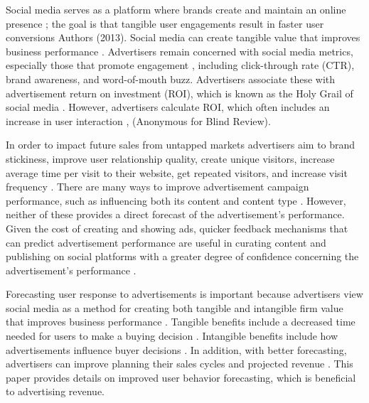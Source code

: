 \documentclass[mksc,blindrev]{informs3} %
\begin{document}
Social media serves as a platform where brands create and maintain an online presence \cite{Greenwood2016}; the goal is that tangible user engagements result in faster user conversions Authors (2013). Social media can create tangible value that improves business performance \cite{Barreto2013}. Advertisers remain concerned with social media metrics, especially those that promote engagement \cite{Tiago2014}, including click-through rate (CTR), brand awareness, and word-of-mouth buzz. Advertisers associate these with advertisement return on investment (ROI), which is known as the Holy Grail of social media \cite{Fisher2009}. However, advertisers calculate ROI, which often includes an increase in user interaction \cite{Romero2011}, (Anonymous for Blind Review). 


In order to impact future sales from untapped markets \cite{Guo2020} advertisers aim to brand stickiness, improve user relationship quality, create unique visitors, increase average time per visit to their website, get repeated visitors, and increase visit frequency \cite{Bhat2002}. There are many ways to improve advertisement campaign performance, such as influencing both its content and content type \cite{Imsa2020}. However, neither of these provides a direct forecast of the advertisement’s performance. Given the cost of creating and showing ads, quicker feedback mechanisms that can predict advertisement performance are useful in curating content and publishing on social platforms with a greater degree of confidence concerning the advertisement’s performance \cite{Hu2016}.



Forecasting user response to advertisements is important because advertisers view social media as a method for creating both tangible and intangible firm value that improves business performance \cite{Barreto2013}. Tangible benefits include a decreased time needed for users to make a buying decision \cite{Barreto2013}. Intangible benefits include how advertisements influence buyer decisions \cite{Barreto2013}. In addition, with better forecasting, advertisers can improve planning their sales cycles and projected revenue \cite{Imsa2020}. This paper provides details on improved user behavior forecasting, which is beneficial to advertising revenue. 
\end{document}
